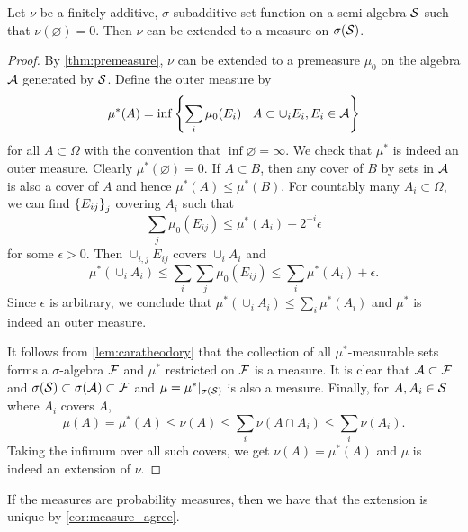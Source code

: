 \begin{theorem}
    Let $\nu$ be a finitely additive, $\sigma$-subadditive 
    set function on a semi-algebra $\S$ such that $\nu(\varnothing) = 0$. 
    Then $\nu$ can be extended to a measure on $\sigma(\S)$. 
\end{theorem}
\begin{proof}
    By \cref{thm:premeasure}, $\nu$ can be extended to a premeasure $\mu_0$ 
    on the algebra $\A$ generated by $\S$. Define the outer measure by 
    \begin{equation*}
        \mu^*(A) = \inf\Set{\sum_i \mu_0(E_i)}{A\subset \cup_i E_i, E_i\in\A}
    \end{equation*}
    for all $A\subset\Omega$ with the convention that $\inf\varnothing = \infty$. 
    We check that $\mu^*$ is indeed an outer measure. Clearly $\mu^*(\varnothing) = 0$. 
    If $A\subset B$, then any cover of $B$ by sets in $\A$ is also a cover of 
    $A$ and hence $\mu^*(A)\leq \mu^*(B)$. For countably many $A_i\subset\Omega$, 
    we can find $\set{E_{ij}}_j$ covering $A_i$ such that 
    \begin{equation*}
        \sum_j \mu_0(E_{ij}) \leq \mu^*(A_i) + 2^{-i}\epsilon
    \end{equation*}
    for some $\epsilon>0$. Then $\cup_{i,j} E_{ij}$ covers $\cup_i A_i$ 
    and 
    \begin{equation*}
        \mu^*(\cup_i A_i)\leq \sum_i\sum_j \mu_0(E_{ij})
        \leq \sum_i \mu^*(A_i) + \epsilon.
    \end{equation*}
    Since $\epsilon$ is arbitrary, we conclude that 
    $\mu^*(\cup_i A_i)\leq \sum_i \mu^*(A_i)$ and $\mu^*$ is 
    indeed an outer measure. 

    It follows from \cref{lem:caratheodory} that the collection
    of all $\mu^*$-measurable sets forms a $\sigma$-algebra $\F$ and
    $\mu^*$ restricted on $\F$ is a measure. It is clear that $\A\subset\F$
    and $\sigma(\S)\subset\sigma(\A)\subset\F$ and $\mu = \mu^*|_{\sigma(\S)}$
    is also a measure. Finally, for $A, A_i\in\S$ where $A_i$ covers 
    $A$, 
    \begin{equation*}
        \mu(A) = \mu^*(A) \leq \nu(A) \leq \sum_i \nu(A\cap A_i) 
        \leq \sum_i \nu(A_i).
    \end{equation*}
    Taking the infimum over all such covers, we get $\nu(A) = \mu^*(A)$ 
    and $\mu$ is indeed an extension of $\nu$. 
\end{proof}
\begin{remark}
    If the measures are probability measures, then we have that the extension 
    is unique by \cref{cor:measure_agree}. 
\end{remark}


